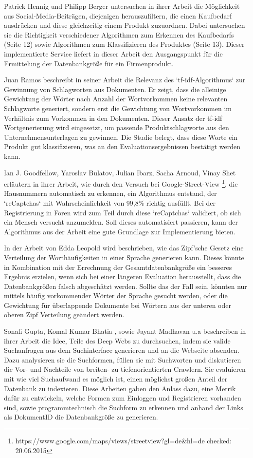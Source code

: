 Patrick Hennig und Philipp Berger \cite{n2o} untersuchen in ihrer Arbeit die Möglichkeit aus Social-Media-Beiträgen, diejenigen herauszufiltern, die einen Kaufbedarf ausdrücken und diese gleichzeitig einem Produkt zuzuordnen. Dabei untersuchen sie die Richtigkeit verschiedener Algorithmen zum Erkennen des Kaufbedarfs (Seite 12) sowie Algorithmen zum Klassifizieren des Produktes (Seite 13). Dieser implementierte Service liefert in dieser Arbeit den Ausgangspunkt für die Ermittelung der Datenbankgröße für ein Firmenprodukt.

Juan Ramos \cite{ramos2003using} beschreibt in seiner Arbeit die Relevanz des `tf-idf-Algorithmus` zur Gewinnung von Schlagworten aus Dokumenten. Er zeigt, dass die alleinige Gewichtung der Wörter nach Anzahl der Wortvorkommen keine relevanten Schlagworte generiert, sondern erst die Gewichtung von Wortvorkommen im Verhältnis zum Vorkommen in den Dokumenten. Dieser Ansatz der tf-idf Wortgenerierung wird eingesetzt, um passende Produktschlagworte aus den Unternehmensunterlagen zu gewinnen. Die Studie belegt, dass diese Worte ein Produkt gut klassifizieren, was an den Evaluationsergebnissen bestätigt werden kann.

Ian J. Goodfellow, Yaroslav Bulatov, Julian Ibarz, Sacha Arnoud, Vinay Shet \cite{goodfellow2013multi} erläutern in ihrer Arbeit, wie durch den Versuch bei Google-Street-View \footnote{https://www.google.com/maps/views/streetview?gl=de\&hl=de checked: 20.06.2015}, die Hausnummern automatisch zu erkennen, ein Algorithmus entstand, der `reCaptchas` mit Wahrscheinlichkeit von 99,8\% richtig ausfüllt. Bei der Registrierung in Foren wird zum Teil durch diese `reCaptchas` validiert, ob sich ein Mensch versucht anzumelden. Soll dieses automatisiert passieren, kann der Algorithmus aus der Arbeit eine gute Grundlage zur Implementierung bieten.

In der Arbeit von Edda Leopold \cite{leopold2002zipfsche} wird beschrieben, wie das Zipf'sche Gesetz eine Verteilung der Worthäufigkeiten in einer Sprache generieren kann. Dieses könnte in Kombination mit der Errechnung der Gesamtdatenbankgröße ein besseres Ergebnis erzielen, wenn sich bei einer längeren Evaluation herausstellt, dass die Datenbankgrößen falsch abgeschätzt werden. Sollte das der Fall sein, könnten nur mittels häufig vorkommender Wörter der Sprache gesucht werden, oder die Gewichtung für überlappende Dokumente bei Wörtern aus der unteren oder oberen Zipf Verteilung geändert werden. 

Sonali Gupta, Komal Kumar Bhatia \cite{gupta2014comparative}, sowie Jayant Madhavan u.a \cite{madhavan2008google} beschreiben in ihrer Arbeit die Idee, Teile des Deep Webs zu durchsuchen, indem sie valide Suchanfragen aus dem Suchinterface generieren und an die Webseite absenden. Dazu analysieren sie die Suchformen, füllen sie mit Suchworten und diskutieren die Vor- und Nachteile von breiten- zu tiefenorientierten Crawlern. Sie evaluieren mit wie viel Suchaufwand es möglich ist, einen möglichst großen Anteil der Datenbank zu indexieren. Diese Arbeiten gaben den Anlass dazu, eine Metrik dafür zu entwickeln, welche Formen zum Einloggen und Registrieren vorhanden sind, sowie programmtechnisch die Suchform zu erkennen und anhand der Links als DokumentID die Datenbankgröße zu generieren.

